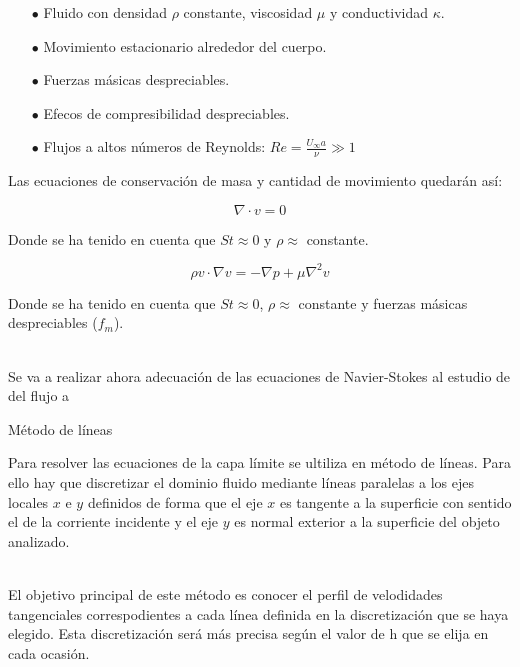 \documentclass[11pt,a4paper]{article}
\begin{document}
\begin{enumerate}[\hspace*{0.5cm}]
\item[$\bullet$] Fluido con densidad $\rho$ constante, viscosidad $\mu$  y conductividad $\kappa$.
\item[$\bullet$] Movimiento estacionario alrededor del cuerpo.
\item[$\bullet$] Fuerzas másicas despreciables.
\item[$\bullet$] Efecos de compresibilidad despreciables.
\item[$\bullet$] Flujos a altos números de Reynolds: $Re=\frac{U_{\infty} a}{\nu} \gg 1 $
\end{enumerate}

\vspace{1cm}


Las ecuaciones de conservación de masa y cantidad de movimiento quedarán así:

\begin{equation}
\nabla \cdot v=0
\end{equation}

Donde se ha tenido en cuenta que $St\approx 0$ y $\rho \approx$ constante.

\begin{equation}
\rho v \cdot \nabla v = -\nabla p + \mu \nabla^{2} v 
\end{equation}

Donde se ha tenido en cuenta que $St \approx 0$, $\rho \approx$ constante y fuerzas másicas despreciables ($f_{m}$).

\\

Se va a realizar ahora adecuación de las ecuaciones de Navier-Stokes al estudio de del flujo a 



\newpage
\begin{center}
  {\Large Método de líneas}
\end{center}

Para resolver las ecuaciones de la capa límite se ultiliza en método de líneas. Para ello hay que discretizar el dominio fluido mediante líneas paralelas a los ejes locales $x$ e $y$ definidos de forma que el eje $x$ es tangente a la superficie con sentido el de la corriente incidente y el eje $y$ es normal exterior a la superficie del objeto analizado.

\\

El objetivo principal de este método es conocer el perfil de velodidades tangenciales correspodientes a cada línea definida en la discretización que se haya elegido. Esta discretización será más precisa según el valor de h que se elija en cada ocasión.
\end{document}
